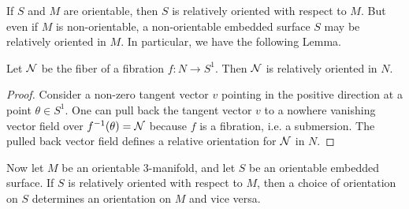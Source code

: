 If $S$ and $M$ are orientable, then $S$ is relatively oriented with respect to $M$.
But even if $M$ is non-orientable, a non-orientable embedded surface $S$ may be relatively oriented in $M$.  In particular, we have the following Lemma.
\begin{lem}
  \label{lem:fibers-relatively-oriented}
  Let $\mathcal{N}$ be the fiber of a fibration $f: N \to S^1$.
  Then $\mathcal{N}$ is relatively oriented in $N$.
\end{lem}
\begin{proof}
Consider a non-zero tangent vector $v$ pointing in the positive direction at a point $\theta \in S^1$.
One can pull back the tangent vector $v$ to a nowhere vanishing vector field over $f^{-1}(\theta) = \mathcal{N}$ because $f$ is a fibration, i.e. a submersion.
The pulled back vector field defines a relative orientation for $\mathcal{N}$ in $N$.
\end{proof}

 Now let $M$ be an orientable 3-manifold, and let $S$ be an orientable embedded surface.  If $S$ is relatively oriented with respect to $M$, then a choice of orientation on $S$ determines an orientation on $M$ and vice versa.

%
\smallskip

